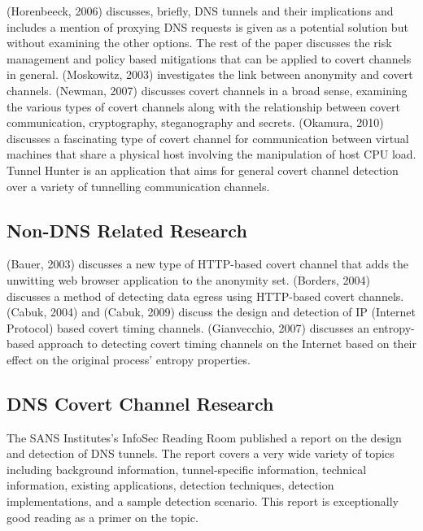 \documentclass{llncs}
\begin{document}
(Horenbeeck, 2006)\cite{Horenbeeck2006} discusses, briefly, DNS tunnels and
their implications and includes a mention of proxying DNS requests is given as a
potential solution but without examining the other options. The rest of the
paper discusses the risk management and policy based mitigations that can be
applied to covert channels in general. (Moskowitz, 2003)\cite{Moskowitz2003}
investigates the link between anonymity and covert channels. (Newman,
2007)\cite{Newman2007} discusses covert channels in a broad sense, examining the
various types of covert channels along with the relationship between covert
communication, cryptography, steganography and secrets. (Okamura,
2010)\cite{Okamura2010} discusses a fascinating type of covert channel for
communication between virtual machines that share a physical host involving the
manipulation of host CPU load. Tunnel Hunter\cite{Dusi2009} is an application
that aims for general covert channel detection over a variety of tunnelling
communication channels.

\subsection{Non-DNS Related Research}

(Bauer, 2003)\cite{Bauer2003} discusses a new type of HTTP-based covert channel
that adds the unwitting web browser application to the anonymity set. (Borders,
2004)\cite{Borders2004} discusses a method of detecting data egress using
HTTP-based covert channels. (Cabuk, 2004)\cite{Cabuk2004} and (Cabuk,
2009)\cite{Cabuk2009} discuss the design and detection of IP (Internet Protocol)
based covert timing channels. (Gianvecchio, 2007)\cite{Gianvecchio2007}
discusses an entropy-based approach to detecting covert timing channels on the
Internet based on their effect on the original process' entropy properties.

\subsection{DNS Covert Channel Research}
\label{litreview-dns}
The SANS
Institutes's InfoSec Reading Room published a report on the design and detection
of DNS tunnels\cite{SANS2013}. The report covers a very wide variety of topics
including background information, tunnel-specific information, technical
information, existing applications, detection techniques, detection
implementations, and a sample detection scenario. This report is exceptionally
good reading as a primer on the topic.
\end{document}
